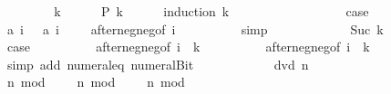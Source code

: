 \begin{isabellebody}
\ \ \isamarkupfalse%
\isanewline
\ \ \ \ \isamarkupfalse%
\ k\isanewline
\ \ \ \ \isamarkupfalse%
\ {\isachardoublequoteopen}{\isacharquery}P\ k{\isachardoublequoteclose}\isanewline
\ \ \ \ \isamarkupfalse%
\ {\isacharparenleft}induction\ k{\isacharparenright}\isanewline
\ \ \ \ \ \ \isamarkupfalse%
\ {}\isanewline
\ \ \ \ \ \ \isamarkupfalse%
\ \isamarkupfalse%
\ {\isacharquery}case\isanewline
\ \ \ \ \ \ \ \ \isamarkupfalse%
\ {\isacharbackquoteopen}{\isacharquery}a\ i\ {\isacharless}\ {}{\isacharbackquoteclose}\ {\isacharbackquoteopen}{\isacharquery}a\ {\isacharparenleft}i\ {\isacharplus}\ {}{\isacharparenright}\ {\isacharless}\ {}{\isacharbackquoteclose}\ after{\isacharunderscore}neg{\isacharunderscore}neg{\isacharbrackleft}of\ i{\isacharbrackright}\isanewline
\ \ \ \ \ \ \ \ \isamarkupfalse%
\ simp\isanewline
\ \ \ \ \isamarkupfalse%
\isanewline
\ \ \ \ \ \ \isamarkupfalse%
\ {\isacharparenleft}Suc\ k{\isacharparenright}\isanewline
\ \ \ \ \ \ \isamarkupfalse%
\ \isamarkupfalse%
\ {\isacharquery}case\isanewline
\ \ \ \ \ \ \ \ \isamarkupfalse%
\ after{\isacharunderscore}neg{\isacharunderscore}neg{\isacharbrackleft}of\ {\isachardoublequoteopen}i\ {\isacharplus}\ {}{\isacharasterisk}k{\isachardoublequoteclose}{\isacharbrackright}\isanewline
\ \ \ \ \ \ \ \ \isamarkupfalse%
\ after{\isacharunderscore}neg{\isacharunderscore}neg{\isacharbrackleft}of\ {\isachardoublequoteopen}i\ {\isacharplus}\ {}{\isacharasterisk}k\ {\isacharplus}\ {}{\isachardoublequoteclose}{\isacharbrackright}\isanewline
\ \ \ \ \ \ \ \ \isamarkupfalse%
\ {\isacharparenleft}simp\ add{\isacharcolon}\ numeral{\isacharunderscore}{}{\isacharunderscore}eq{\isacharunderscore}{}\ numeral{\isacharunderscore}Bit{}{\isacharparenright}\isanewline
\ \ \ \ \isamarkupfalse%
\isanewline
\ \ \isamarkupfalse%
\isanewline
\isanewline
\ \ \isamarkupfalse%
\ {\isachardoublequoteopen}{}\ dvd\ n{\isachardoublequoteclose}\isanewline
\ \ \isamarkupfalse%
{\isacharminus}\isanewline
\ \ \ \ \isamarkupfalse%
\ {\isachardoublequoteopen}n\ mod\ {}\ {\isacharequal}\ {}\ {\isasymor}\ n\ mod\ {}\ {\isacharequal}\ {}\ {\isasymor}\ n\ mod\ {}\ {\isacharequal}\ {}{\isachardoublequoteclose}\isanewline

\end{isabellebody}
